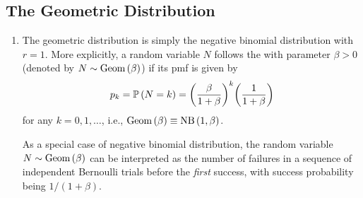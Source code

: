 \subsection{The Geometric Distribution}
\begin{enumerate}
\item The geometric distribution is simply the negative binomial
distribution with \(r=1\). More explicitly, a random variable \(N\) follows the
 with parameter \(\beta>0\) (denoted by
\(N\sim\operatorname{Geom}\left(\beta\right)\)) if its pmf is given by
\[
p_k=\mathbb{P}\left(N=k\right)=\qty(\frac{\beta}{1+\beta})^{k}\qty(\frac{1}{1+\beta})
\]
for any \(k=0,1,\dotsc\), i.e., \(\operatorname{Geom}\left(\beta\right)\equiv\operatorname{NB}\left(1,\beta\right)\).

\begin{note}
As a special case of negative binomial distribution, the random variable
\(N\sim\operatorname{Geom}\left(\beta\right)\) can be interpreted as the number of failures in a sequence
of independent Bernoulli trials before the \emph{first} success, with success
probability being \(1/(1+\beta)\).
\end{note}


\end{enumerate}

